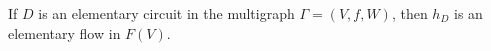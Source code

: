 If $D$ is an elementary circuit in the multigraph $\Gamma = (V, f, W)$, then $h_D$ is an elementary flow in $F(V)$.
